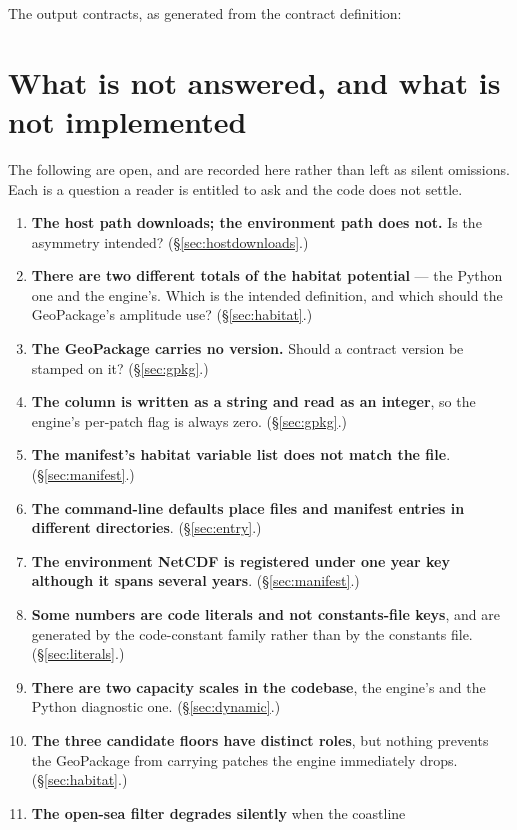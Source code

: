 \documentclass[11pt,a4paper]{article} \usepackage[utf8]{inputenc} \usepackage{lmodern} \usepackage[T1]{fontenc}
\begin{document}
\medskip \noindent The output contracts, as generated from the contract definition:



\section{What is not answered, and what is not implemented} \label{sec:open}

The following are open, and are recorded here rather than left as silent omissions. Each is a
question a reader is entitled to ask and the code does not settle.

\begin{enumerate}
\item \textbf{The host path downloads; the environment path does not.} Is the asymmetry
intended? (\S\ref{sec:hostdownloads}.) 
\item \textbf{There are two different totals of the
habitat potential} --- the Python one and the engine's. Which is the intended definition, and
which should the GeoPackage's amplitude use? (\S\ref{sec:habitat}.) 
\item \textbf{The GeoPackage
carries no version.} Should a contract version be stamped on it? (\S\ref{sec:gpkg}.) 
\item
\textbf{The  column is written as a string and read as an integer}, so the
engine's per-patch flag is always zero. (\S\ref{sec:gpkg}.) 
\item \textbf{The manifest's habitat
variable list does not match the file}. (\S\ref{sec:manifest}.) 
\item \textbf{The command-line
defaults place files and manifest entries in different directories}. (\S\ref{sec:entry}.) 
\item
\textbf{The environment NetCDF is registered under one year key although it spans several
years}. (\S\ref{sec:manifest}.) 
\item \textbf{Some numbers are code literals and not
constants-file keys}, and are generated by the code-constant family rather than by the
constants file. (\S\ref{sec:literals}.) 
\item \textbf{There
are two capacity scales in the codebase}, the engine's and the Python diagnostic one.
(\S\ref{sec:dynamic}.) 
\item \textbf{The three candidate floors have distinct roles}, but
nothing prevents the GeoPackage from carrying patches the engine immediately drops.
(\S\ref{sec:habitat}.) 
\item \textbf{The open-sea filter degrades silently} when the coastline

\end{enumerate}
\end{document}
